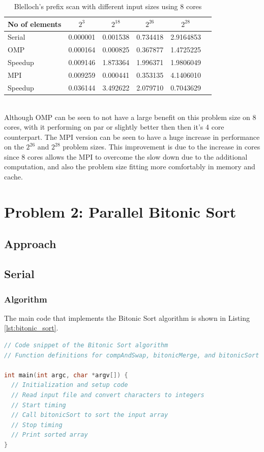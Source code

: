 \begin{table}[htb]
	\centering
	\caption{Blelloch's prefix scan with different input sizes using 8 cores}
	\begin{tabular}{l|ccccc}
		\toprule
		No of elements& $2^3$ & $2^{18}$  & $2^{26}$ & $2^{28}$\\
		\midrule
		Serial 	&0.000001 	&0.001538&0.734418&2.9164853\\
		OMP 	&0.000164	&0.000825&0.367877&1.4725225\\
		Speedup &0.009146	&1.873364&1.996371&1.9806049\\
		MPI 	&0.009259	&0.000441&0.353135&4.1406010\\
		Speedup &0.036144	&3.492622&2.079710&0.7043629\\
		\bottomrule
	\end{tabular}
\end{table}\\
Although OMP can be seen to not have a large benefit on this problem size on 8 cores, with it performing on par or slightly better then then it's 4 core counterpart. The MPI version can be seen to have a huge increase in performance on the ${2^{26}}$ and ${2^{28}}$ problem sizes. This improvement is due to the increase in cores since 8 cores allows the MPI to overcome the slow down due to the additional computation, and also the problem size fitting more comfortably in memory and cache.  
\pagebreak
\section{Problem 2: Parallel Bitonic Sort}
\subsection*{Approach}
\subsection{Serial} 
\subsubsection{Algorithm}
The main code that implements the Bitonic Sort algorithm is shown in Listing \ref{lst:bitonic_sort}.

\begin{lstlisting}[language=C, caption={Bitonic Sort Algorithm}, label={lst:bitonic_sort}]
// Code snippet of the Bitonic Sort algorithm
// Function definitions for compAndSwap, bitonicMerge, and bitonicSort

int main(int argc, char *argv[]) {
  // Initialization and setup code
  // Read input file and convert characters to integers
  // Start timing
  // Call bitonicSort to sort the input array
  // Stop timing
  // Print sorted array
}
\end{lstlisting}

